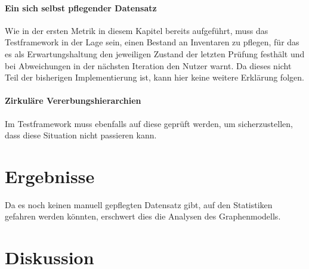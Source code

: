 \paragraph{Ein sich selbst pflegender Datensatz}
Wie in der ersten Metrik in diesem Kapitel bereits aufgeführt, muss das Testframework in der Lage sein, einen Bestand an Inventaren zu pflegen, für das es als Erwartungshaltung den jeweiligen Zustand der letzten Prüfung festhält und bei Abweichungen in der nächsten Iteration den Nutzer warnt.
Da dieses nicht Teil der bisherigen Implementierung ist, kann hier keine weitere Erklärung folgen.

\paragraph{Zirkuläre Vererbungshierarchien}
Im Testframework muss ebenfalls auf diese geprüft werden, um sicherzustellen, dass diese Situation nicht passieren kann.


\section{Ergebnisse}

Da es noch keinen manuell gepflegten Datensatz gibt, auf den Statistiken gefahren werden könnten, erschwert dies die Analysen des Graphenmodells.


\section{Diskussion}




